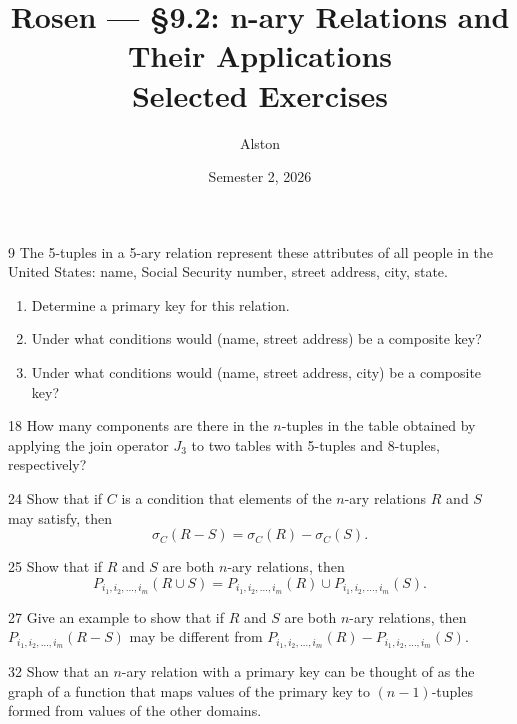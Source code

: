 \documentclass[11pt]{article}
\title{Rosen --- \S 9.2: n-ary Relations and Their Applications\\ \large Selected Exercises}
\author{Alston}
\date{Semester 2, 2026}
\begin{document}
\maketitle

\begin{exercise}{9}
    The 5-tuples in a 5-ary relation represent these attributes of all
    people in the United States: name, Social Security number, street
    address, city, state.
    \begin{enumerate}[label=(\alph*)]
        \item Determine a primary key for this relation.
        \item Under what conditions would (name, street address) be a
        composite key?
        \item Under what conditions would (name, street address,
        city) be a composite key?
    \end{enumerate}
\end{exercise}

\begin{exercise}{18}
    How many components are there in the $n$-tuples in the table
    obtained by applying the join operator $J_3$ to two tables with
    5-tuples and 8-tuples, respectively?
\end{exercise}

\begin{exercise}{24}
    Show that if $C$ is a condition that elements of the $n$-ary
    relations $R$ and $S$ may satisfy, then
    \[
    \sigma_C(R - S) = \sigma_C(R) - \sigma_C(S).
    \]
\end{exercise}

\begin{exercise}{25}
    Show that if $R$ and $S$ are both $n$-ary relations, then
    \[
    P_{i_1, i_2, \dots, i_m}(R \cup S) = P_{i_1, i_2, \dots, i_m}(R)
    \cup P_{i_1, i_2, \dots, i_m}(S).
    \]
\end{exercise}

\begin{exercise}{27}
    Give an example to show that if $R$ and $S$ are both $n$-ary
    relations, then $P_{i_1, i_2, \dots, i_m}(R - S)$ may be different
    from $P_{i_1, i_2, \dots, i_m}(R) - P_{i_1, i_2, \dots, i_m}(S)$.
\end{exercise}

\begin{exercise}{32}
    Show that an $n$-ary relation with a primary key can be thought of
    as the graph of a function that maps values of the primary key to
    $(n-1)$-tuples formed from values of the other domains.
\end{exercise}
\end{document}
